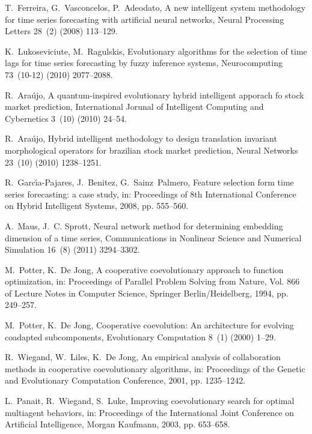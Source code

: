 \documentclass[runningheads]{llncs}
\begin{document}
\begin{thebibliography}{x}
T.~Ferreira, G.~Vasconcelos, P.~Adeodato, A new intelligent system methodology
  for time series forecasting with artificial neural networks, Neural
  Processing Letters 28~(2) (2008) 113--129.

K.~Lukoseviciute, M.~Ragulskis, Evolutionary algorithms for the selection of
  time lags for time series forecasting by fuzzy inference systems,
  Neurocomputing 73~(10-12) (2010) 2077--2088.

R.~Ara\'ujo, A quantum-inspired evolutionary hybrid intelligent apporach fo
  stock market prediction, International Jorunal of Intelligent Computing and
  Cybernetics 3~(10) (2010) 24--54.

R.~Ara\'ujo, Hybrid intelligent methodology to design translation invariant
  morphological operators for brazilian stock market prediction, Neural
  Networks 23~(10) (2010) 1238--1251.

R.~Garc{\'\i}a-Pajares, J.~Benitez, G.~Sainz~Palmero, Feature selection form
  time series forecasting: a case study, in: Proceedings of 8th International
  Conference on Hybrid Intelligent Systems, 2008, pp. 555--560.

A.~Maus, J.~C. Sprott, Neural network method for determining embedding
  dimension of a time series, Communications in Nonlinear Science and Numerical
  Simulation 16~(8) (2011) 3294--3302.

M.~Potter, K.~{De Jong}, A cooperative coevolutionary approach to function
  optimization, in: Proceedings of Parallel Problem Solving from Nature, Vol.
  866 of Lecture Notes in Computer Science, Springer Berlin/Heidelberg, 1994,
  pp. 249--257.

M.~Potter, K.~{De Jong}, Cooperative coevolution: An architecture for evolving
  coadapted subcomponents, Evolutionary Computation 8~(1) (2000) 1--29.

R.~Wiegand, W.~Liles, K.~{De Jong}, An empirical analysis of collaboration
  methods in cooperative coevolutionary algorithms, in: Proceedings of the
  Genetic and Evolutionary Computation Conference, 2001, pp. 1235--1242.

L.~Panait, R.~Wiegand, S.~Luke, Improving coevolutionary search for optimal
  multiagent behaviors, in: Proceedings of the International Joint Conference
  on Artificial Intelligence, Morgan Kaufmann, 2003, pp. 653--658.


\end{thebibliography}
\end{document}
